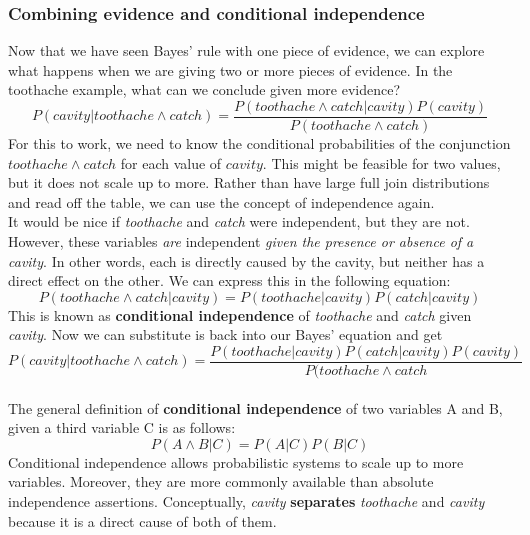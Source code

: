 \documentclass{article}
\newcommand{\n}[0]{\\[\baselineskip]}
\begin{document}
\subsubsection{Combining evidence and conditional independence}
Now that we have seen Bayes' rule with one piece of evidence, we can explore what happens when we are giving two or more pieces of evidence. In the toothache example, what can we conclude given more evidence?
\begin{equation}
P(cavity|toothache \wedge catch) = \frac{P(toothache \wedge catch | cavity)P(cavity)}{P(toothache \wedge catch)}
\end{equation}
For this to work, we need to know the conditional probabilities of the conjunction $toothache \wedge catch$ for each value of $cavity$. This might be feasible for two values, but it does not scale up to more. Rather than have large full join distributions and read off the table, we can use the concept of independence again.
\n
It would be nice if \textit{toothache} and \textit{catch} were independent, but they are not. However, these variables \textit{are} independent \textit{given the presence or absence of a cavity}. In other words, each is directly caused by the cavity, but neither has a direct effect on the other. We can express this in the following equation:
\begin{equation}
P(toothache \wedge catch | cavity) = P(toothache|cavity)P(catch|cavity)
\end{equation}
This is known as \textbf{conditional independence} of \textit{toothache} and \textit{catch} given \textit{cavity}. Now we can substitute is back into our Bayes' equation and get
\begin{equation}
P(cavity|toothache \wedge catch) 
= \frac{P(toothache|cavity)P(catch|cavity)P(cavity)}{P(toothache \wedge catch}
\end{equation}
\\
The general definition of \textbf{conditional independence} of two variables A and B, given a third variable C is as follows:
\begin{equation}
P(A \wedge B | C) = P(A|C)P(B|C)
\end{equation}
Conditional independence allows probabilistic systems to scale up to more variables. Moreover, they are more commonly available than absolute independence assertions. Conceptually, \textit{cavity} \textbf{separates} \textit{toothache} and \textit{cavity} because it is a direct cause of both of them. 
\end{document}
